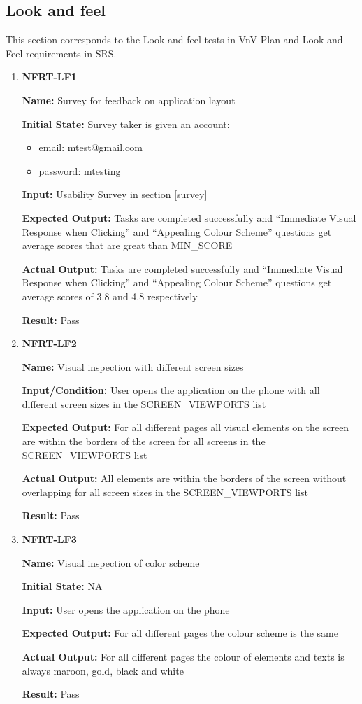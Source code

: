 \documentclass[12pt, titlepage]{article}
\begin{document}
\subsection{Look and feel}
This section corresponds to the Look and feel tests in VnV Plan and Look and Feel requirements in SRS.
\begin{enumerate}
\item \textbf{NFRT-LF1}

\textbf{Name:} Survey for feedback on application layout

\textbf{Initial State:} Survey taker is given an account:
\begin{itemize}
\item email: mtest@gmail.com
\item password: mtesting
\end{itemize}

\textbf{Input:} Usability Survey in section \ref{survey}

\textbf{Expected Output:} Tasks are completed successfully and ``Immediate Visual Response when Clicking'' and ``Appealing Colour Scheme'' questions get average scores that are great than MIN\_SCORE

\textbf{Actual Output:} Tasks are completed successfully and ``Immediate Visual Response when Clicking'' and ``Appealing Colour Scheme'' questions get average scores of 3.8 and 4.8 respectively

\textbf{Result:} Pass

\item \textbf{NFRT-LF2}

\textbf{Name:} Visual inspection with different screen sizes

\textbf{Input/Condition:} User opens the application on the phone with all different screen sizes in the SCREEN\_VIEWPORTS list

\textbf{Expected Output:} For all different pages all visual elements on the screen are within the borders of the screen for all screens in the SCREEN\_VIEWPORTS list

\textbf{Actual Output:} All elements are within the borders of the screen without overlapping for all screen sizes in the SCREEN\_VIEWPORTS list

\textbf{Result:} Pass

\item \textbf{NFRT-LF3}

\textbf{Name:} Visual inspection of color scheme

\textbf{Initial State:} NA
					
\textbf{Input:} User opens the application on the phone

\textbf{Expected Output:} For all different pages the colour scheme is the same

\textbf{Actual Output:} For all different pages the colour of elements and texts is always maroon, gold, black and white

\textbf{Result:} Pass
\end{enumerate}
\end{document}
